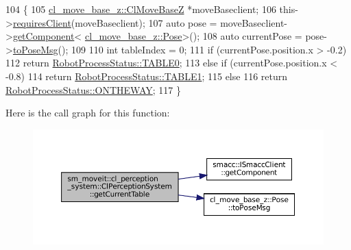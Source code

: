 \begin{DoxyCode}
104     \{
105         \hyperlink{classcl__move__base__z_1_1ClMoveBaseZ}{cl\_move\_base\_z::ClMoveBaseZ} *moveBaseclient;
106         this->\hyperlink{classsmacc_1_1ISmaccClient_a7a9990a2f3e35d547671188d69fee520}{requiresClient}(moveBaseclient);
107         \textcolor{keyword}{auto} pose = moveBaseclient->\hyperlink{classsmacc_1_1ISmaccClient_adef78db601749ca63c19e74a27cb88cc}{getComponent}<
      \hyperlink{classcl__move__base__z_1_1Pose}{cl\_move\_base\_z::Pose}>();
108         \textcolor{keyword}{auto} currentPose = pose->\hyperlink{classcl__move__base__z_1_1Pose_a9faf8c6b437ff6b19c8bddd692908dca}{toPoseMsg}();
109 
110         \textcolor{keywordtype}{int} tableIndex = 0;
111         \textcolor{keywordflow}{if} (currentPose.position.x > -0.2)
112             \textcolor{keywordflow}{return} \hyperlink{namespacesm__moveit_1_1cl__perception__system_a730c3fd4da64d10a75ca4ab014fdbe40a1fd65c0ced0ead229bf6dd6a59067a4f}{RobotProcessStatus::TABLE0};
113         \textcolor{keywordflow}{else} \textcolor{keywordflow}{if} (currentPose.position.x < -0.8)
114             \textcolor{keywordflow}{return} \hyperlink{namespacesm__moveit_1_1cl__perception__system_a730c3fd4da64d10a75ca4ab014fdbe40a5b22e42e5d94a94037a4486a4976c49d}{RobotProcessStatus::TABLE1};
115         \textcolor{keywordflow}{else}
116             \textcolor{keywordflow}{return} \hyperlink{namespacesm__moveit_1_1cl__perception__system_a730c3fd4da64d10a75ca4ab014fdbe40a92f7ea3097b3fdb1b7a25669cfc1b8bd}{RobotProcessStatus::ONTHEWAY};
117     \}
\end{DoxyCode}
Here is the call graph for this function\+:
\nopagebreak
\begin{figure}[H]
\begin{center}
\leavevmode
\includegraphics[width=350pt]{classsm__moveit_1_1cl__perception__system_1_1ClPerceptionSystem_a2eb71e292ac7aca0c71dc71d84f38bea_cgraph}
\end{center}
\end{figure}
\mbox{\label{classsm__moveit_1_1cl__perception__system_1_1ClPerceptionSystem_a4c489e34241bc43c865f06a437827aa9}} 
